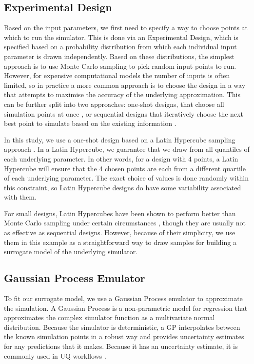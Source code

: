 \documentclass[openacc]{rstransa}%
\begin{document}
\subsection{Experimental Design}

\label{experimentaldesign}

Based on the input parameters, we first need to specify a way to choose points at which to run the simulator.
This is done via an Experimental Design, which is specified based on a probability distribution from which
each individual input parameter is drawn independently. Based on these distributions, the simplest approach
is to use Monte Carlo sampling to pick random input points to run. However, for expensive computational
models the number of inputs is often limited, so in practice a more common approach is to choose
the design in a way that attempts to maximise the accuracy of the underlying approximation. This can be
further split into two approaches: one-shot designs, that choose all simulation points at once \cite{lhc},
or sequential designs that iteratively choose the next best point to simulate based on the existing
information \cite{mice}.

In this study, we use a one-shot design based on a Latin Hypercube sampling approach \cite{lhc}. In a Latin
Hypercube, we guarantee that we draw from all quantiles of each underlying parameter. In other words,
for a design with 4 points, a Latin Hypercube will ensure that the 4 chosen points are each from
a different quartile of each underlying parameter. The exact choice of values is done randomly
within this constraint, so Latin Hypercube designs do have some variability associated with them.

For small designs, Latin Hypercubes have been shown to perform better than Monte Carlo sampling under
certain circumstances \cite{lhc}, though they are usually not as effective as sequential designs. However, because
of their simplicity, we use them in this example as a straightforward way to draw samples for
building a surrogate model of the underlying simulator.

\subsection{Gaussian Process Emulator}

To fit our surrogate model, we use a Gaussian Process emulator to approximate the simulation.
A Gaussian Process is a non-parametric model for regression that approximates the complex simulator
function as a multivariate normal distribution. Because the simulator is deterministic,
a GP interpolates between the known simulation points in a robust way and provides uncertainty
estimates for any predictions that it makes. Because it has an uncertainty estimate, it is commonly
used in UQ workflows \cite{calibration,histmatch,mice}.
\end{document}
